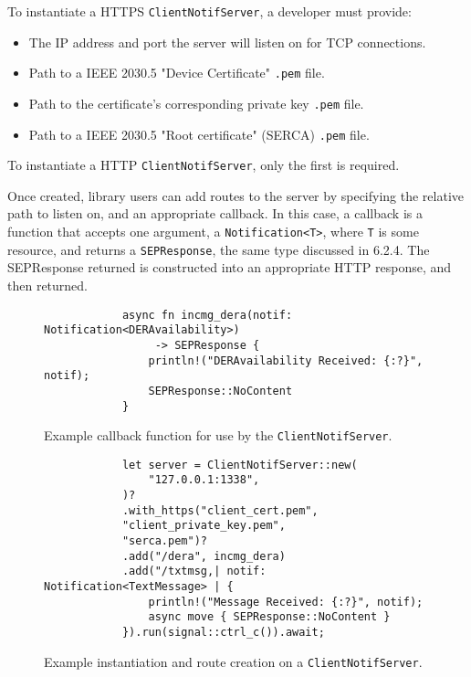 To instantiate a HTTPS \texttt{ClientNotifServer}, a developer must provide:

\begin{itemize}
    \item The IP address and port the server will listen on for TCP connections.
    \item Path to a IEEE 2030.5 "Device Certificate" \texttt{.pem} file.
    \item Path to the certificate's corresponding private key \texttt{.pem} file.
    \item Path to a IEEE 2030.5 "Root certificate" (SERCA) \texttt{.pem} file. 
\end{itemize}

To instantiate a HTTP \texttt{ClientNotifServer}, only the first is required.

Once created, library users can add routes to the server by specifying the relative path to listen on, and an appropriate callback. In this case, a callback is a function that accepts one argument, a \texttt{Notification<T>}, where \texttt{T} is some resource, and returns a \texttt{SEPResponse}, the same type discussed in 6.2.4. The SEPResponse returned is constructed into an appropriate HTTP response, and then returned.

\begin{figure}[h]
    \begin{center}
        \begin{lstlisting}
            async fn incmg_dera(notif: Notification<DERAvailability>)
                 -> SEPResponse {
                println!("DERAvailability Received: {:?}", notif);
                SEPResponse::NoContent
            }
        \end{lstlisting}
        \label{fig:notiffn}
        \vspace{-10pt}
        \caption{Example callback function for use by the \texttt{ClientNotifServer}.}
    \end{center}
\end{figure}

\begin{figure}[h]
    \begin{center}
        \begin{lstlisting}
            let server = ClientNotifServer::new(
                "127.0.0.1:1338",
            )?
            .with_https("client_cert.pem",
            "client_private_key.pem",
            "serca.pem")?
            .add("/dera", incmg_dera)
            .add("/txtmsg,| notif: Notification<TextMessage> | {
                println!("Message Received: {:?}", notif);
                async move { SEPResponse::NoContent }
            }).run(signal::ctrl_c()).await;
        \end{lstlisting}
        \label{fig:notifroutes}
        \vspace{-10pt}
        \caption{Example instantiation and route creation on a \texttt{ClientNotifServer}.}
    \end{center}
\end{figure}

